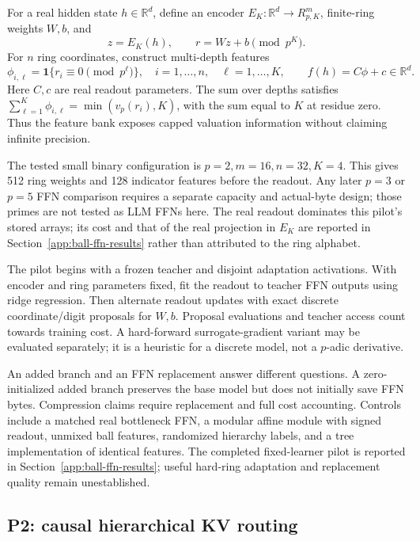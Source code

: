 \documentclass[11pt]{article}
\newcommand{\R}{\mathbb{R}}
\newcommand{\ind}{\mathbf{1}}
\newcommand{\vp}{v_p}
\begin{document}
For a real hidden state \(h\in\R^d\), define an encoder
\(E_K:\R^d\to R_{p,K}^{m}\), finite-ring weights \(W,b\), and
\[
 z=E_K(h),\qquad r=Wz+b\pmod{p^K}.
\]
For \(n\) ring coordinates, construct multi-depth features
\begin{equation}
 \phi_{i,\ell}=\ind\{r_i\equiv0\pmod{p^\ell}\},
 \quad i=1,\ldots,n,\quad \ell=1,\ldots,K,
 \qquad f(h)=C\phi+c\in\R^d .
 \label{eq:ffn}
\end{equation}
Here \(C,c\) are real readout parameters. The sum over depths satisfies
\(\sum_{\ell=1}^{K}\phi_{i,\ell}=\min(\vp(r_i),K)\), with the sum equal
to \(K\) at residue zero. Thus the feature bank exposes capped valuation
information without claiming infinite precision.

The tested small binary configuration is \(p=2,m=16,n=32,K=4\).
This gives 512 ring weights and 128 indicator features before the readout.
Any later \(p=3\) or \(p=5\) FFN comparison requires a separate capacity and
actual-byte design; those primes are not tested as LLM FFNs here.
The real readout dominates this pilot's stored arrays; its cost and that of
the real projection in \(E_K\) are reported in
Section~\ref{app:ball-ffn-results} rather than attributed to the ring alphabet.

The pilot begins with a frozen teacher and disjoint adaptation activations.
With encoder and ring parameters fixed, fit the readout to teacher FFN
outputs using ridge regression. Then alternate
readout updates with exact discrete coordinate/digit proposals for \(W,b\).
Proposal evaluations and teacher access count towards training cost.
A hard-forward surrogate-gradient variant may be evaluated separately;
it is a heuristic for a discrete model, not a \(p\)-adic derivative.

An added branch and an FFN replacement answer different questions.
A zero-initialized added branch preserves the base model but does not initially
save FFN bytes. Compression claims require replacement and full cost accounting.
Controls include a matched real bottleneck FFN, a modular affine module with
signed readout, unmixed ball features, randomized hierarchy labels, and a tree
implementation of identical features. The completed fixed-learner pilot is
reported in Section~\ref{app:ball-ffn-results}; useful hard-ring adaptation and
replacement quality remain unestablished.

\subsection{P2: causal hierarchical KV routing}
\end{document}
